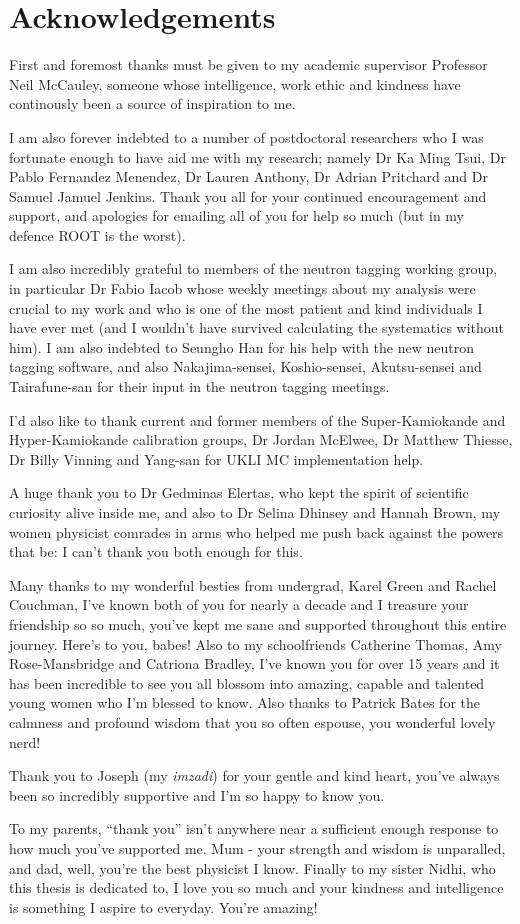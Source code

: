 \chapter*{Acknowledgements}
\thispagestyle{empty}
First and foremost thanks must be given to my academic supervisor Professor Neil McCauley, someone whose intelligence, work ethic and kindness have continously been a source of inspiration to me. 

I am also forever indebted to a number of postdoctoral researchers who I was fortunate enough to have aid me with my research; namely Dr Ka Ming Tsui, Dr Pablo Fernandez Menendez, Dr Lauren Anthony, Dr Adrian Pritchard and Dr Samuel Jamuel Jenkins. Thank you all for your continued encouragement and support, and apologies for emailing all of you for help so much (but in my defence ROOT is the worst).

I am also incredibly grateful to members of the neutron tagging working group, in particular Dr Fabio Iacob whose weekly meetings about my analysis were crucial to my work and who is one of the most patient and kind individuals I have ever met (and I wouldn't have survived calculating the systematics without him). I am also indebted to Seungho Han for his help with the new neutron tagging software, and also Nakajima-sensei, Koshio-sensei, Akutsu-sensei and Tairafune-san for their input in the neutron tagging meetings. 

I'd also like to thank current and former members of the Super-Kamiokande and Hyper-Kamiokande calibration groups, Dr Jordan McElwee, Dr Matthew Thiesse, Dr Billy Vinning and Yang-san for UKLI MC implementation help. 
 
A huge thank you to Dr Gedminas Elertas, who kept the spirit of scientific curiosity alive inside me, and also to Dr Selina Dhinsey and Hannah Brown, my women physicist comrades in arms who helped me push back against the powers that be: I can't thank you both enough for this. 

Many thanks to my wonderful besties from undergrad, Karel Green and Rachel Couchman, I've known both of you for nearly a decade and I treasure your friendship so so much, you've kept me sane and supported throughout this entire journey. Here's to you, babes!
Also to my schoolfriends Catherine Thomas, Amy Rose-Mansbridge and Catriona Bradley, I've known you for over 15 years and it has been incredible to see you all blossom into amazing, capable and talented young women who I'm blessed to know. Also thanks to Patrick Bates for the calmness and profound wisdom that you so often espouse, you wonderful lovely nerd! 

Thank you to Joseph (my \textit{imzadi}) for your gentle and kind heart, you've always been so incredibly supportive and I'm so happy to know you.  

To my parents, ``thank you'' isn't anywhere near a sufficient enough response to how much you've supported me. Mum - your strength and wisdom is unparalled, and dad, well, you're the best physicist I know. Finally to my sister Nidhi, who this thesis is dedicated to, I love you so much and your kindness and intelligence is something I aspire to everyday. You're amazing! 

